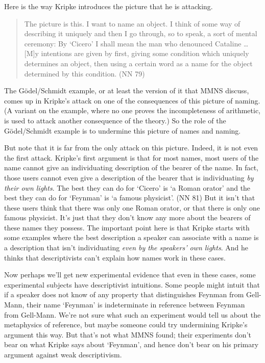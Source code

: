 \documentclass[
  10pt,
  letterpaper,
  DIV=11,
  numbers=noendperiod,
  twoside]{scrartcl}
\begin{document}
Here is the way Kripke introduces the picture that he is attacking.

\begin{quote}
The picture is this. I want to name an object. I think of some way of
describing it uniquely and then I go through, so to speak, a sort of
mental ceremony: By `Cicero' I shall mean the man who denounced Cataline
\ldots{} {[}M{]}y intentions are given by first, giving some condition
which uniquely determines an object, then using a certain word as a name
for the object determined by this condition. (NN 79)
\end{quote}

The Gödel/Schmidt example, or at least the version of it that MMNS
discuss, comes up in Kripke's attack on one of the consequences of this
picture of naming. (A variant on the example, where no one proves the
incompleteness of arithmetic, is used to attack another consequence of
the theory.) So the role of the Gödel/Schmidt example is to undermine
this picture of names and naming.

But note that it is far from the only attack on this picture. Indeed, it
is not even the first attack. Kripke's first argument is that for most
names, most users of the name cannot give an individuating description
of the bearer of the name. In fact, those users cannot even give a
description of the bearer that is individuating \emph{by their own
lights}. The best they can do for `Cicero' is `a Roman orator' and the
best they can do for `Feynman' is `a famous physicist'. (NN 81) But it
isn't that these users think that there was only one Roman orator, or
that there is only one famous physicist. It's just that they don't know
any more about the bearers of these names they possess. The important
point here is that Kripke starts with some examples where the best
description a speaker can associate with a name is a description that
isn't individuating \emph{even by the speakers' own lights}. And he
thinks that descriptivists can't explain how names work in these cases.

Now perhaps we'll get new experimental evidence that even in these
cases, some experimental subjects have descriptivist intuitions. Some
people might intuit that if a speaker does not know of any property that
distinguishes Feynman from Gell-Mann, their name `Feynman' is
indeterminate in reference between Feynman from Gell-Mann. We're not
sure what such an experiment would tell us about the metaphysics of
reference, but maybe someone could try undermining Kripke's argument
this way. But that's not what MMNS found; their experiments don't bear
on what Kripke says about `Feynman', and hence don't bear on his primary
argument against weak descriptivism.
\end{document}
